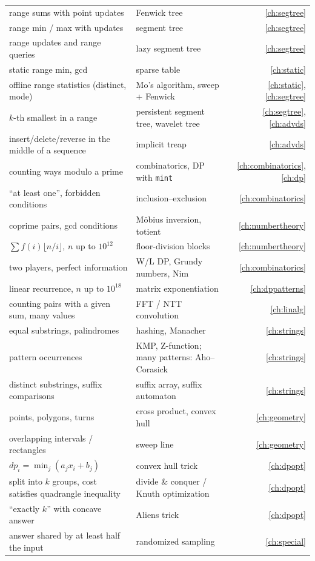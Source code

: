 \begin{small}
\begin{longtable}{>{\raggedright\arraybackslash}p{6.4cm}>{\raggedright\arraybackslash}p{6.3cm}r}
range sums with point updates & Fenwick tree & \ref{ch:segtree} \\
range min / max with updates & segment tree & \ref{ch:segtree} \\
range updates and range queries & lazy segment tree & \ref{ch:segtree} \\
static range min, gcd & sparse table & \ref{ch:static} \\
offline range statistics (distinct, mode) & Mo's algorithm, sweep + Fenwick & \ref{ch:static}, \ref{ch:segtree} \\
$k$-th smallest in a range & persistent segment tree, wavelet tree & \ref{ch:segtree}, \ref{ch:advds} \\
insert/delete/reverse in the middle of a sequence & implicit treap & \ref{ch:advds} \\
counting ways modulo a prime & combinatorics, DP with \texttt{mint} & \ref{ch:combinatorics}, \ref{ch:dp} \\
``at least one'', forbidden conditions & inclusion--exclusion & \ref{ch:combinatorics} \\
coprime pairs, gcd conditions & M\"obius inversion, totient & \ref{ch:numbertheory} \\
$\sum f(i)\lfloor n/i\rfloor$, $n$ up to $10^{12}$ & floor-division blocks & \ref{ch:numbertheory} \\
two players, perfect information & W/L DP, Grundy numbers, Nim & \ref{ch:combinatorics} \\
linear recurrence, $n$ up to $10^{18}$ & matrix exponentiation & \ref{ch:dppatterns} \\
counting pairs with a given sum, many values & FFT / NTT convolution & \ref{ch:linalg} \\
equal substrings, palindromes & hashing, Manacher & \ref{ch:strings} \\
pattern occurrences & KMP, Z-function; many patterns: Aho--Corasick & \ref{ch:strings} \\
distinct substrings, suffix comparisons & suffix array, suffix automaton & \ref{ch:strings} \\
points, polygons, turns & cross product, convex hull & \ref{ch:geometry} \\
overlapping intervals / rectangles & sweep line & \ref{ch:geometry} \\
$dp_i = \min_j (a_j x_i + b_j)$ & convex hull trick & \ref{ch:dpopt} \\
split into $k$ groups, cost satisfies quadrangle inequality & divide \& conquer / Knuth optimization & \ref{ch:dpopt} \\
``exactly $k$'' with concave answer & Aliens trick & \ref{ch:dpopt} \\
answer shared by at least half the input & randomized sampling & \ref{ch:special} \\
\end{longtable}
\end{small}

